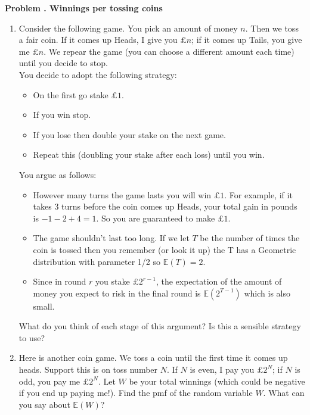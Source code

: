 \documentclass[11pt]{article}
\newcounter{problem}
\newenvironment{problem}[1][]{%
  \refstepcounter{problem}%
  \bigskip\noindent\textbf{Problem \theproblem. #1}\par\smallskip\noindent
}{\bigskip}
\begin{document}
\begin{problem}[Winnings per tossing coins]
\begin{enumerate}
      \item Consider the following game. You pick an amount of money $n$. Then we toss 
            a fair coin. If it comes up Heads, I give you $\pounds n$; if it comes up 
            Tails, you give me $\pounds n$. We repear the game (you can choose a different 
            amount each time) until you decide to stop. \\
            You decide to adopt the following strategy:
            \begin{itemize}
                  \item On the first go stake $\pounds 1$.
                  \item If you win stop.
                  \item If you lose then double your stake on the next game.
                  \item Repeat this (doubling your stake after each loss) until you win.
            \end{itemize}
            You argue as follows:
            \begin{itemize}
                  \item However many turns the game lasts you will win $\pounds 1$. For 
                        example, if it takes 3 turns before the coin comes up Heads, your 
                        total gain in pounds is $-1-2+4=1$. So you are guaranteed to make $\pounds 1$.
                  \item The game shouldn't last too long. If we let $T$ be the number of 
                        times the coin is tossed then you remember (or look it up) the T 
                        has a Geometric distribution with parameter 1/2 so $\mathbb{E}(T)=2$.
                  \item Since in round $r$ you stake $\pounds 2^{r-1}$, the expectation of 
                        the amount of money you expect to risk in the final round is 
                        $\mathbb{E}(2^{T-1})$ which is also small.
            \end{itemize}
            What do you think of each stage of this argument? Is this a sensible strategy 
            to use?
      \item Here is another coin game. We toss a coin until the first time it comes up heads. 
            Support this is on toss number $N$. If $N$ is even, I pay you $\pounds 2^N$; if $N$ 
            is odd, you pay me $\pounds 2^N$. Let $W$ be your total winnings (which could be negative 
            if you end up paying me!). Find the pmf of the random variable $W$. What can you say 
            about $\mathbb{E}(W)$?
\end{enumerate}
\end{problem}
\end{document}
